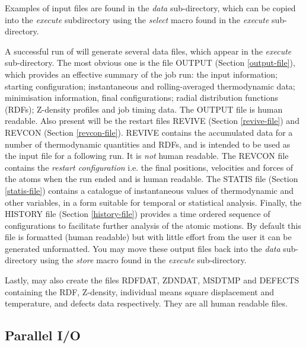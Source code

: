 Examples of input files are found in the {\em data} sub-directory,
which can be copied into the {\em execute} subdirectory using the {\sl
select} macro found in the {\em execute} sub-directory.

A successful run of \D will generate several data files, which
appear in the {\em execute} sub-directory.  The most obvious one
is the file OUTPUT (Section \ref{output-file}), which provides an
effective summary of the job run: the input information; starting
configuration; instantaneous and rolling-averaged thermodynamic
data; minimisation information, final configurations;
radial distribution functions (RDFs); Z-density profiles
and job timing data.  The OUTPUT file is human readable.  Also
present will be the restart files REVIVE (Section
\ref{revive-file}) and REVCON (Section \ref{revcon-file}).  REVIVE
contains the accumulated data for a number of thermodynamic
quantities and RDFs, and is intended to be used as the input file
for a following run.  It is {\em not} human readable.  The REVCON
file contains the {\em restart configuration} i.e. the final
positions, velocities and forces of the atoms when the run ended
and is human readable.  The STATIS file (Section
\ref{statis-file}) contains a catalogue of instantaneous values of
thermodynamic and other variables, in a form suitable for temporal
or statistical analysis.  Finally, the HISTORY file (Section
\ref{history-file}) provides a time ordered sequence of
configurations to facilitate further analysis of the atomic
motions.  By default this file is formatted (human readable) but
with little effort from the user it can be generated unformatted.
You may move these output files back into the {\em data}
sub-directory using the {\sl store} macro found in the {\em
execute} sub-directory.

Lastly, \D may also create the files RDFDAT, ZDNDAT, MSDTMP
and DEFECTS containing the RDF, Z-density, individual means square
displacement and temperature, and defects data respectively.  They
are all human readable files.

\subsection{Parallel I/O}


